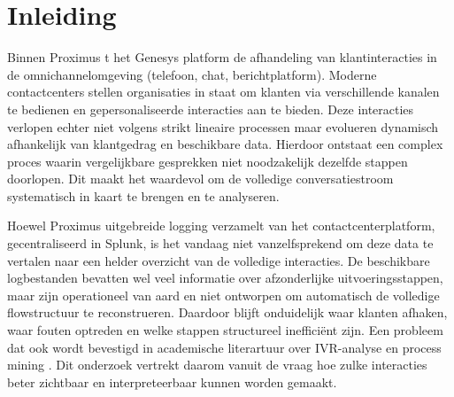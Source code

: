 


% 

\section{Inleiding}%
\label{sec:inleiding}
Binnen Proximus t het Genesys platform de afhandeling van klantinteracties in de omnichannelomgeving (telefoon, chat, berichtplatform). Moderne contactcenters stellen organisaties in staat om klanten via verschillende kanalen te bedienen en gepersonaliseerde interacties aan te bieden. Deze interacties verlopen echter niet volgens strikt lineaire processen maar evolueren dynamisch afhankelijk van klantgedrag en beschikbare data. Hierdoor ontstaat een complex proces waarin vergelijkbare gesprekken niet noodzakelijk dezelfde stappen doorlopen. Dit maakt het waardevol om de volledige conversatiestroom systematisch in kaart te brengen en te analyseren.

Hoewel Proximus uitgebreide logging verzamelt van het contactcenterplatform, gecentraliseerd in Splunk, is het vandaag niet vanzelfsprekend om deze data te vertalen naar een helder overzicht van de volledige interacties. De beschikbare logbestanden bevatten wel veel informatie over afzonderlijke uitvoeringsstappen, maar zijn operationeel van aard en niet ontworpen om automatisch de volledige flowstructuur te reconstrueren. Daardoor blijft onduidelijk waar klanten afhaken, waar fouten optreden en welke stappen structureel inefficiënt zijn. Een probleem dat ook wordt bevestigd in academische literartuur over IVR-analyse en process mining \autocite{Ellway2016,Antonio2024}. Dit onderzoek vertrekt daarom vanuit de vraag hoe zulke interacties beter zichtbaar en interpreteerbaar kunnen worden gemaakt.

